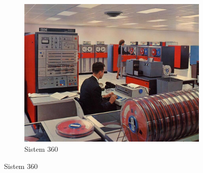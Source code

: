 \documentclass{beamer}
\begin{document}
\begin{frame}[fragile]
\begin{figure}[htb]
\begin{subfigure}{0.25\textwidth}
  \includegraphics[width=\linewidth]{sys360.jpg}
  \caption{Sistem 360}
  \label{fig:3}
\end{subfigure}


\end{figure}
\end{frame}
\end{document}
